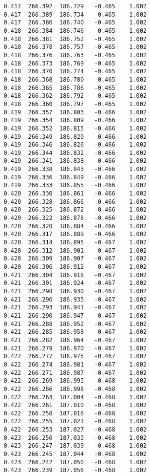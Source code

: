 \begin{verbatim}
   0.417  266.392  186.729   -0.465    1.002
   0.417  266.389  186.734   -0.465    1.002
   0.417  266.386  186.740   -0.465    1.002
   0.418  266.384  186.746   -0.465    1.002
   0.418  266.381  186.752   -0.465    1.002
   0.418  266.378  186.757   -0.465    1.002
   0.418  266.376  186.763   -0.465    1.002
   0.418  266.373  186.769   -0.465    1.002
   0.418  266.370  186.774   -0.465    1.002
   0.418  266.368  186.780   -0.465    1.002
   0.418  266.365  186.786   -0.465    1.002
   0.418  266.362  186.792   -0.465    1.002
   0.418  266.360  186.797   -0.465    1.002
   0.419  266.357  186.803   -0.466    1.002
   0.419  266.354  186.809   -0.466    1.002
   0.419  266.352  186.815   -0.466    1.002
   0.419  266.349  186.820   -0.466    1.002
   0.419  266.346  186.826   -0.466    1.002
   0.419  266.344  186.832   -0.466    1.002
   0.419  266.341  186.838   -0.466    1.002
   0.419  266.338  186.843   -0.466    1.002
   0.419  266.336  186.849   -0.466    1.002
   0.419  266.333  186.855   -0.466    1.002
   0.420  266.330  186.861   -0.466    1.002
   0.420  266.328  186.866   -0.466    1.002
   0.420  266.325  186.872   -0.466    1.002
   0.420  266.322  186.878   -0.466    1.002
   0.420  266.320  186.884   -0.466    1.002
   0.420  266.317  186.889   -0.466    1.002
   0.420  266.314  186.895   -0.467    1.002
   0.420  266.312  186.901   -0.467    1.002
   0.420  266.309  186.907   -0.467    1.002
   0.420  266.306  186.912   -0.467    1.002
   0.421  266.304  186.918   -0.467    1.002
   0.421  266.301  186.924   -0.467    1.002
   0.421  266.298  186.930   -0.467    1.002
   0.421  266.296  186.935   -0.467    1.002
   0.421  266.293  186.941   -0.467    1.002
   0.421  266.290  186.947   -0.467    1.002
   0.421  266.288  186.952   -0.467    1.002
   0.421  266.285  186.958   -0.467    1.002
   0.421  266.282  186.964   -0.467    1.002
   0.421  266.279  186.970   -0.467    1.002
   0.422  266.277  186.975   -0.467    1.002
   0.422  266.274  186.981   -0.467    1.002
   0.422  266.271  186.987   -0.467    1.002
   0.422  266.269  186.993   -0.468    1.002
   0.422  266.266  186.998   -0.468    1.002
   0.422  266.263  187.004   -0.468    1.002
   0.422  266.261  187.010   -0.468    1.002
   0.422  266.258  187.016   -0.468    1.002
   0.422  266.255  187.021   -0.468    1.002
   0.422  266.253  187.027   -0.468    1.002
   0.423  266.250  187.033   -0.468    1.002
   0.423  266.247  187.039   -0.468    1.002
   0.423  266.245  187.044   -0.468    1.002
   0.423  266.242  187.050   -0.468    1.002
   0.423  266.239  187.056   -0.468    1.002

\end{verbatim}
